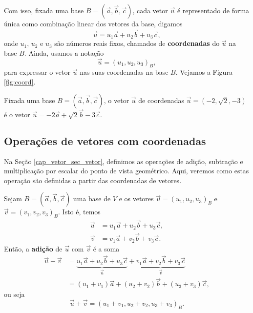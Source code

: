 Com isso, fixada uma base $B = (\vec{a}, \vec{b}, \vec{c})$, cada vetor $\vec{u}$ é representado de forma única como combinação linear dos vetores da base, digamos
\begin{equation}
  \vec{u} = u_1\vec{a} + u_2\vec{b} + u_3\vec{c},
\end{equation}
onde $u_1$, $u_2$ e $u_3$ são números reais fixos, chamados de {\bf coordenadas} do $\vec{u}$ na base $B$. Ainda, usamos a notação
\begin{equation}
  \vec{u} = (u_1, u_2, u_3)_B,
\end{equation}
para expressar o vetor $\vec{u}$ nas suas coordenadas na base $B$. Vejamos a Figura \ref{fig:coord}.

\begin{ex}
  Fixada uma base $B = (\vec{a}, \vec{b}, \vec{c})$, o vetor $\vec{u}$ de coordenadas $\vec{u}=(-2,\sqrt{2},-3)$ é o vetor $\vec{u} = -2\vec{a} + \sqrt{2}\vec{b} - 3\vec{c}$.
\end{ex}

\subsection{Operações de vetores com coordenadas}


Na Seção \ref{cap_vetor_sec_vetor}, definimos as operações de adição, subtração e multiplicação por escalar do ponto de vista geométrico. Aqui, veremos como estas operação são definidas a partir das coordenadas de vetores.

Sejam $B = (\vec{a}, \vec{b}, \vec{c})$ uma base de $V$ e os vetores $\vec{u} = (u_1, u_2, u_3)_B$ e $\vec{v} = (v_1, v_2, v_3)_B$. Isto é, temos
\begin{align}
  \vec{u} &= u_1\vec{a} + u_2\vec{b} + u_3\vec{c},\\
  \vec{v} &= v_1\vec{a} + v_2\vec{b} + v_3\vec{c}.
\end{align}
Então, a {\bf adição} de $\vec{u}$ com $\vec{v}$ é a soma
\begin{align}
  \vec{u}+\vec{v} &= \underbrace{u_1\vec{a} + u_2\vec{b} + u_3\vec{c}}_{\vec{u}} + \underbrace{v_1\vec{a} + v_2\vec{b} + v_3\vec{c}}_{\vec{v}}\\
  &= (u_1+v_1)\vec{a} + (u_2+v_2)\vec{b} + (u_3+v_3)\vec{c},
\end{align}
ou seja
\begin{equation}
  \vec{u}+\vec{v}=(u_1+v_1, u_2+v_2, u_3+v_3)_B.
\end{equation}

